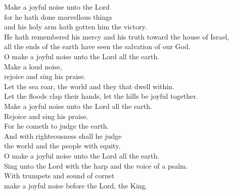 {\vfill 

\clearpage






\begin{center}
	
Make a joyful noise unto the Lord\\for he hath done marvellous things\\and
his holy arm hath gotten him the victory.\\
He hath remembered his mercy and his truth toward the house of Israel,\\
all the ends of the earth have seen the salvation of our God.\\
O make a joyful noise unto the Lord all the earth.\\Make a loud noise,\\
rejoice and sing his praise.\\
Let the sea roar, the world and they that dwell within.\\
Let the floods clap their hands, let the hills be joyful together.\\
Make a joyful noise unto the Lord all the earth.\\
Rejoice and sing his praise. \\For he cometh to judge the earth.\\
And with righteousness shall he judge\\the world and the people with equity.\\
O make a joyful noise unto the Lord all the earth.\\Sing unto the Lord with
the harp and the voice of a psalm.\\With trumpets and sound of cornet\\
make a joyful noise before the Lord, the King.
\end{center}

\clearpage



\begin{center}
	

\end{center}}
